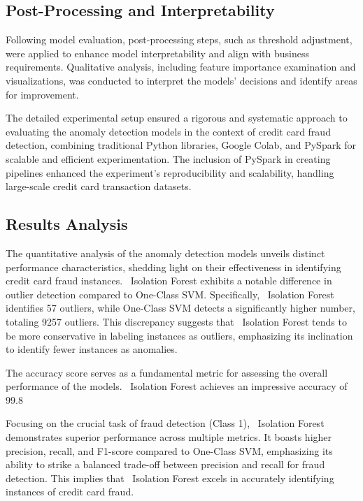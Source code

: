 \documentclass[journal]{IEEEtran}
\begin{document}
\subsection{Post-Processing and Interpretability}

Following model evaluation, post-processing steps, such as threshold adjustment, were applied to enhance model interpretability and align with business requirements. Qualitative analysis, including feature importance examination and visualizations, was conducted to interpret the models' decisions and identify areas for improvement.

The detailed experimental setup ensured a rigorous and systematic approach to evaluating the anomaly detection models in the context of credit card fraud detection, combining traditional Python libraries, Google Colab, and PySpark for scalable and efficient experimentation. The inclusion of PySpark in creating pipelines enhanced the experiment's reproducibility and scalability, handling large-scale credit card transaction datasets.

\subsection{Results Analysis}
The quantitative analysis of the anomaly detection models unveils distinct performance characteristics, shedding light on their effectiveness in identifying credit card fraud instances. ~Isolation Forest exhibits a notable difference in outlier detection compared to One-Class SVM. Specifically, ~Isolation Forest identifies 57 outliers, while One-Class SVM detects a significantly higher number, totaling 9257 outliers. This discrepancy suggests that ~Isolation Forest tends to be more conservative in labeling instances as outliers, emphasizing its inclination to identify fewer instances as anomalies.

The accuracy score serves as a fundamental metric for assessing the overall performance of the models. ~Isolation Forest achieves an impressive accuracy of 99.8%

Focusing on the crucial task of fraud detection (Class 1), ~Isolation Forest demonstrates superior performance across multiple metrics. It boasts higher precision, recall, and F1-score compared to One-Class SVM, emphasizing its ability to strike a balanced trade-off between precision and recall for fraud detection. This implies that ~Isolation Forest excels in accurately identifying instances of credit card fraud.
\end{document}
